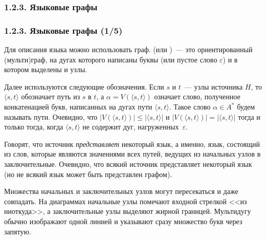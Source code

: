\subsubsection{1.2.3. Языковые графы }
\label{1.2.3.}
\begin{frame}
\frametitle{1.2.3. Языковые графы (1/5)}
Для описания языка можно использовать граф. 
 (или )~---
это ориентированный (мульти)граф, на дугах которого написаны буквы (или пустое слово
$\varepsilon$) и в котором выделены
 и
 узлы.

\smallskip
Далее
используются следующие обозначения. Если $s$ и $t$~--- узлы
источника $H$, то $\langle s, t\rangle$ обозначает путь из $s$ в
$t$, а $\alpha= V(\langle s, t\rangle)$ означает слово, полученное
конкатенацией букв, написанных на дугах пути $\langle s,
t\rangle$. Такое слово $\alpha \in A^*$ будем называть
 пути. Очевидно, что $|V(\langle
s, t \rangle)|\leq |\langle s, t\rangle|$  и $|V(\langle s, t
\rangle)| = |\langle s, t \rangle|$ тогда и только тогда, когда
$\langle s, t \rangle$  не содержит дуг, нагруженных~$\varepsilon$.

\smallskip
Говорят, что источник {\em представляет} некоторый язык, а именно,
язык, состоящий из слов, которые являются значениями всех путей,
ведущих из начальных узлов в заключительные.
Очевидно, что всякий источник представляет некоторый язык (но не
всякий язык может быть представлен графом).

\begin{remark}
Множества начальных и заключительных узлов могут пересекаться и
даже совпадать. На диаграммах начальные узлы помечают входной стрелкой
<<из ниоткуда>>, а заключительные узлы выделяют жирной границей. Мультидугу обычно изображают одной линией и указывают
сразу множество букв через запятую.
\end{remark}
\end{frame}

